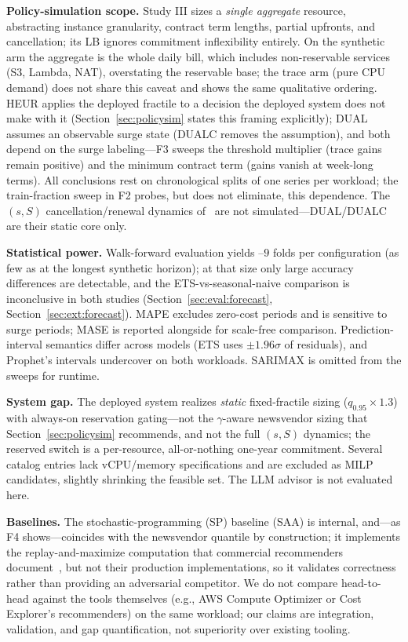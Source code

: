 \documentclass[10pt,journal]{IEEEtran}
\begin{document}
\textbf{Policy-simulation scope.} Study III sizes a \emph{single aggregate}
resource, abstracting instance granularity, contract term lengths, partial
upfronts, and cancellation; its LB ignores commitment inflexibility
entirely. On the synthetic arm the aggregate is the whole daily bill,
which includes non-reservable services (S3, Lambda, NAT), overstating the
reservable base; the trace arm (pure CPU demand) does not share this caveat
and shows the same qualitative ordering. HEUR applies the deployed fractile
to a decision the deployed system does not make with it
(Section~\ref{sec:policysim} states this framing explicitly); DUAL assumes
an observable surge state (DUALC removes the assumption), and both depend
on the surge labeling---F3 sweeps the threshold multiplier (trace gains
remain positive) and the minimum contract term (gains vanish at week-long
terms). All
conclusions rest on chronological splits of one series per workload; the
train-fraction sweep in F2 probes, but does not eliminate, this dependence.
The $(s,S)$ cancellation/renewal dynamics of~\cite{chen2024capacity} are
not simulated---DUAL/DUALC are their static core only.

\textbf{Statistical power.} Walk-forward evaluation yields
\minFolds--$9$ folds per configuration (as few as \minFolds{} at the longest
synthetic horizon); at that size only large accuracy
differences are detectable, and the ETS-vs-seasonal-naive comparison is
inconclusive in both studies (Section~\ref{sec:eval:forecast},
Section~\ref{sec:ext:forecast}). MAPE excludes zero-cost periods and is
sensitive to surge periods; MASE is reported alongside for scale-free
comparison. Prediction-interval semantics differ across models (ETS uses
$\pm1.96\sigma$ of residuals), and Prophet's intervals undercover on both
workloads. SARIMAX is omitted from the sweeps for runtime.

\textbf{System gap.} The deployed system realizes \emph{static}
fixed-fractile sizing ($q_{0.95}{\times}1.3$) with always-on reservation
gating---not the $\gamma$-aware newsvendor sizing that
Section~\ref{sec:policysim} recommends, and not the full $(s,S)$ dynamics;
the reserved switch is a per-resource, all-or-nothing one-year commitment.
Several catalog entries lack vCPU/memory specifications and are excluded as
MILP candidates, slightly shrinking the feasible set. The LLM advisor is
not evaluated here.

\textbf{Baselines.} The stochastic-programming (SP) baseline (SAA) is
internal, and---as F4 shows---coincides with the newsvendor quantile by
construction; it implements the replay-and-maximize computation that
commercial recommenders document~\cite{awsri2026,azureres2026}, but not
their production implementations, so it validates correctness rather than
providing an adversarial competitor. We do not compare head-to-head against
the tools themselves (e.g., AWS Compute Optimizer or Cost Explorer's
recommenders) on the same workload; our claims are integration, validation,
and gap quantification, not superiority over existing tooling.
\end{document}

